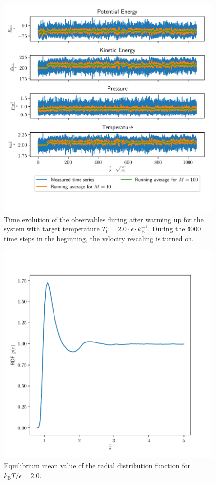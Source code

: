 \documentclass[a4paper,10pt,bibtotoc]{scrartcl}
\begin{document}
\begin{figure}
        \centering
        \includegraphics[width=\linewidth]{equi2.pdf}
    \caption{Time evolution of the observables during after warming up for the system with target temperature $T_0 = 2.0\cdot \epsilon\cdot k_\mathrm{B}^{-1}$. During the 6000 time steps in the beginning, the velocity rescaling is turned on.}
    \label{fig:figz0}
\end{figure}
\begin{figure}
        \centering
        \includegraphics[width=\linewidth]{rdf2.pdf}
    \caption{Equilibrium mean value of the radial distribution function for $k_\mathrm{B}T/\epsilon=2.0$.}
    \label{fig:figz1}
\end{figure}
\end{document}
